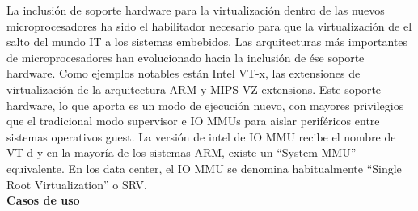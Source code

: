 La inclusión de soporte hardware para la virtualización dentro de las nuevos microprocesadores ha sido
el habilitador necesario para que la virtualización de el salto del mundo IT a los sistemas embebidos. Las
arquitecturas más importantes de microprocesadores han evolucionado hacia la inclusión de ése soporte hardware.
Como ejemplos notables están Intel VT-x, las extensiones de virtualización de la arquitectura ARM y MIPS VZ
extensions.
Este soporte hardware, lo que aporta es un modo de ejecución nuevo, con mayores privilegios que el tradicional modo
supervisor e IO MMUs para aislar periféricos entre sistemas operativos guest. La versión de intel de IO MMU recibe el
nombre de VT-d y en la mayoría de los sistemas ARM, existe un ``System MMU'' equivalente. En los data center, el IO MMU se denomina habitualmente ``Single Root Virtualization'' o SRV.\\[1cm]
\textbf{Casos de uso}
